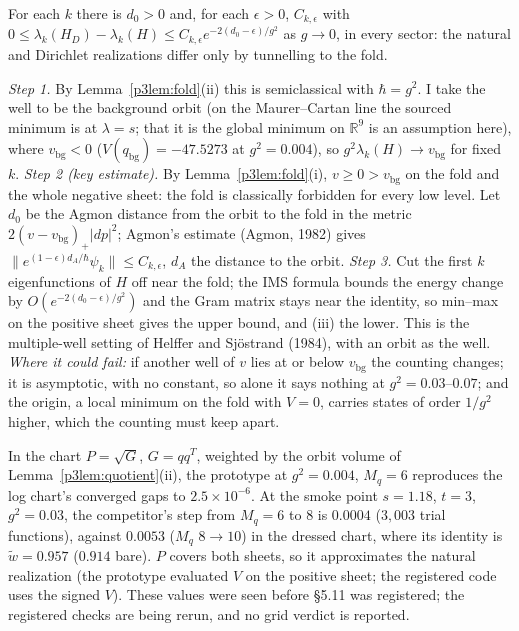 \begin{conjecture}\label{p3conj:fold}
 For each $k$ there is $d_0>0$ and, for each $\epsilon>0$, $C_{k,\epsilon}$ with
$0\leq\lambda_k(H_D)-\lambda_k(H)\leq C_{k,\epsilon}e^{-2(d_0-\epsilon)/g^2}$ as $g\to0$, in every sector: the natural
and Dirichlet realizations differ only by tunnelling to the fold.
\end{conjecture}
\begin{sketch}
\emph{Step 1.} By Lemma~\ref{p3lem:fold}(ii) this is semiclassical with $\hbar=g^2$. I take the well to be the background orbit (on the Maurer--Cartan line the sourced minimum is at $\lambda=s$; that it is the global minimum on $\mathbb R^9$ is an assumption here),
where $v_{\mathrm{bg}}<0$ ($V(q_{\mathrm{bg}})=-47.5273$ at $g^2=0.004$), so $g^2\lambda_k(H)\to v_{\mathrm{bg}}$ for fixed $k$.
\emph{Step 2 (key estimate).} By Lemma~\ref{p3lem:fold}(i), $v\geq0>v_{\mathrm{bg}}$ on the fold and the whole negative
sheet: the fold is classically forbidden for every low level. Let $d_0$ be the Agmon distance from the orbit to the fold
in the metric $2(v-v_{\mathrm{bg}})_+|dp|^2$; Agmon's estimate (Agmon, 1982) gives
$\|e^{(1-\epsilon)d_A/\hbar}\psi_k\|\leq C_{k,\epsilon}$, $d_A$ the distance to the orbit. \emph{Step 3.} Cut the first $k$
eigenfunctions of $H$ off near the fold; the IMS formula bounds the energy change by $O(e^{-2(d_0-\epsilon)/g^2})$ and the
Gram matrix stays near the identity, so min--max on the positive sheet gives the upper bound, and (iii) the lower. This
is the multiple-well setting of Helffer and Sj\"ostrand (1984), with an orbit as the well. \emph{Where it could fail:}
if another well of $v$ lies at or below $v_{\mathrm{bg}}$ the counting changes; it is asymptotic, with no constant, so alone it says nothing at $g^2=0.03$--$0.07$; and the origin, a local minimum on
the fold with $V=0$, carries states of order $1/g^2$ higher, which the counting must keep apart.
\end{sketch}

\begin{remark}\label{p3rem:chart}
 In the chart $P=\sqrt G$, $G=qq^T$, weighted by the orbit volume of Lemma~\ref{p3lem:quotient}(ii), the
prototype at $g^2=0.004$, $M_q=6$ reproduces the log chart's converged gaps to $2.5\times10^{-6}$. At the smoke point
$s=1.18$, $t=3$, $g^2=0.03$, the competitor's step from $M_q=6$ to $8$ is $0.0004$ ($3{,}003$ trial functions), against
$0.0053$ ($M_q$ $8\to10$) in the dressed chart, where its identity is $\tilde w=0.957$ ($0.914$ bare). $P$ covers both sheets, so it
approximates the natural realization (the prototype evaluated $V$ on the positive sheet; the registered code uses the signed $V$). These values were seen before \S5.11 was registered; the registered checks are
being rerun, and no grid verdict is reported.
\end{remark}
